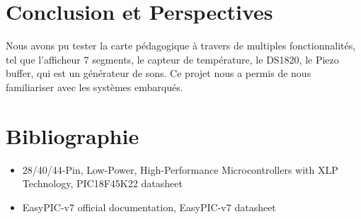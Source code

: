 \documentclass[a4paper, 12pt]{book}
\begin{document}
\cite{redbook}

\chapter{Conclusion et Perspectives\label{chap-conclusion}}
Nous avons pu tester la carte pédagogique à travers de multiples fonctionnalités, tel que l'afficheur 7 segments, le capteur de température, le DS1820, le Piezo buffer, qui est un générateur de sons. 
Ce projet nous a permis de nous familiariser avec les systèmes embarqués.

\chapter{Bibliographie}
\begin{itemize}
\item 28/40/44-Pin, Low-Power, High-Performance Microcontrollers with XLP Technology, PIC18F45K22 datasheet
\item EasyPIC-v7 official documentation, EasyPIC-v7 datasheet
\end{itemize}



\end{document}
